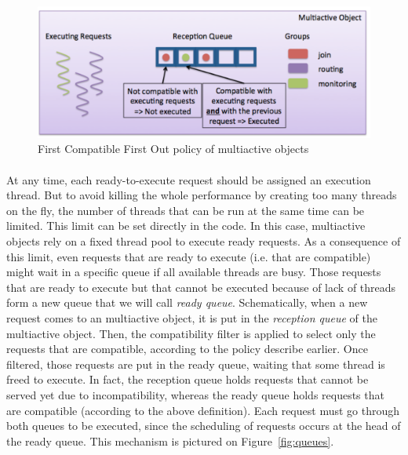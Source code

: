 \documentclass[11pt]{report}
\begin{document}
\begin{figure}[ht]
      \begin{minipage}[c]{\textwidth}
      \centering
      \includegraphics[scale=0.5]{pictures/multiactive_object.pdf}
      \end{minipage}
      \caption{First Compatible First Out policy of multiactive objects}
      \label{fig:multiactive_object}
\end{figure}

\paragraph{}
At any time, each ready-to-execute request should be assigned an execution thread. But to avoid killing the whole performance by creating too many threads on the fly, the number of threads that can be run at the same time can be limited. This limit can be set directly in the code. In this case, multiactive objects rely on a fixed thread pool to execute ready requests.  
As a consequence of this limit, even requests that are ready to execute (i.e. that are compatible) might wait in a specific queue if all available threads are busy. Those requests that are ready to execute but that cannot be executed because of lack of threads form a new queue that we will call \emph{ready queue}. 
Schematically, when a new request comes to an multiactive object, it is put in the \emph{reception queue} of the multiactive object. Then, the compatibility filter is applied to select only the requests that are compatible, according to the policy describe earlier. Once filtered, those requests are put in the ready queue, waiting that some thread is freed to execute. In fact, the reception queue holds requests that cannot be served yet due to incompatibility, whereas the ready queue holds requests that are compatible (according to the above definition). Each request must go through both queues to be executed, since the scheduling of requests occurs at the head of the ready queue. This mechanism is pictured on Figure~\ref{fig:queues}.
\end{document}
